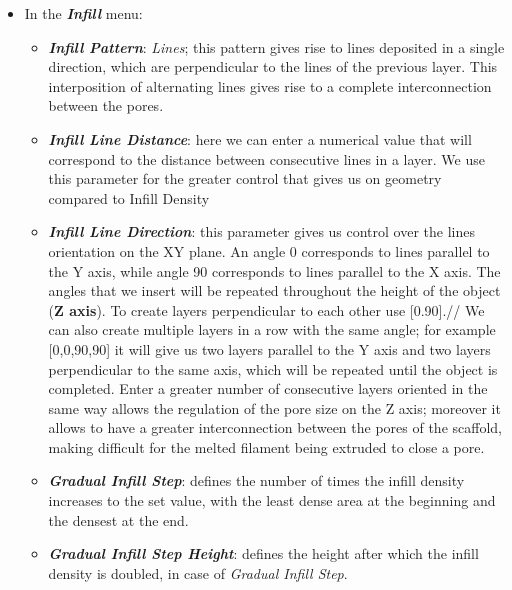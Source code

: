 \begin{itemize}
\item In the \emph{\textbf{Infill}} menu:

\begin{itemize}
\item \textit{\textbf{Infill Pattern}}: \emph{Lines}; this pattern gives rise to lines deposited in a single direction, which are perpendicular to the lines of the previous layer. This interposition of alternating lines gives rise to a complete interconnection between the pores.\\
\item \emph {\textbf{Infill Line Distance}}: here we can enter a numerical value that will correspond to the distance between consecutive lines in a layer. We use this parameter for the greater control that gives us on geometry compared to Infill Density
\item \emph{\textbf{Infill Line Direction}}: this parameter gives us control over the lines orientation on the XY plane. An angle 0 corresponds to lines parallel to the Y axis, while angle 90 corresponds to lines parallel to the X axis. The angles that we insert will be repeated throughout the height of the object (\textbf{Z axis}). To create layers perpendicular to each other use [0.90].//
We can also create multiple layers in a row with the same angle; for example [0,0,90,90] it will give us two layers parallel to the Y axis and two layers perpendicular to the same axis, which will be repeated until the object is completed. Enter a greater number of consecutive layers oriented in the same way allows the regulation of the pore size on the Z axis; moreover it allows to have a greater interconnection between the pores of the scaffold, making difficult for the melted filament being extruded to close a pore.
\item \emph{\textbf{Gradual Infill Step}}: defines the number of times the infill density increases to the set value, with the least dense area at the beginning and the densest at the end.
\item \emph{\textbf{Gradual Infill Step Height}}: defines the height after which the infill density is doubled, in case of \emph{Gradual Infill Step}.
\end{itemize}

\end{itemize}

